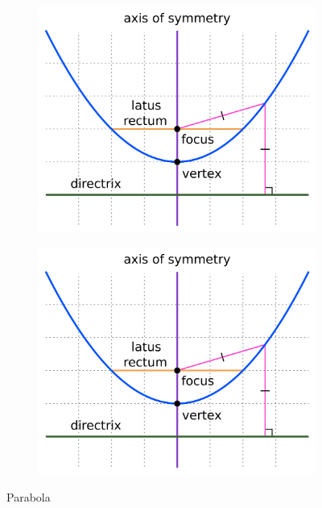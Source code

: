 \documentclass[10pt,twocolumn]{article}
\begin{document}
\begin{figure}[h]
\begin{subfigure}{0.2\textwidth}
		\end{subfigure}\\
		\begin{subfigure}{0.2\textwidth}
			\includegraphics[width=1\textwidth,right]{parabola}
		\end{subfigure}
		\begin{subfigure}{0.2\textwidth}
			\includegraphics[width=1\textwidth,left]{parabola}
		\end{subfigure}
		\caption{Parabola}
	\end{figure}
	\blindtext[3]
	\lipsum
\end{document}
